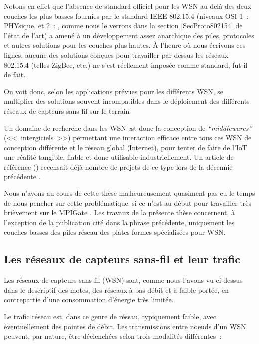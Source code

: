 Notons en effet que l'absence de standard officiel pour les WSN au-delà
des deux couches les plus basses fournies par le standard IEEE 802.15.4
(niveaux OSI 1~: PHYsique, et 2~: , comme
nous le verrons dans la section \vref{SecProto802154} de l'état
de l'art) a amené à un développement assez anarchique des piles, protocoles
et autres solutions pour les couches plus hautes. À l'heure où nous écrivons
ces lignes, aucune des solutions conçues pour travailler par-dessus les
réseaux 802.15.4 (telles ZigBee, etc.) ne s'est réellement imposée comme
standard, fut-il de fait.

On voit donc, selon les applications prévues pour les différents WSN,
se multiplier des solutions souvent incompatibles dans le déploiement
des différents réseaux de capteurs sans-fil sur le terrain.

Un domaine de recherche dans les WSN est donc la conception de
\emph{``middlewares''} (<<~intergiciels~>>) permettant une interaction
efficace entre tous ces WSN de conception différente et le réseau global
(Internet), pour tenter de faire de l'IoT une réalité tangible, fiable et
donc utilisable industriellement. Un article de référence ()
recensait déjà nombre de projets de ce type lors de la décennie précédente
\cite{Middleware-WSN-Survey-2008}.

Nous n'avons au cours de cette thèse malheureusement quasiment pas
eu le temps de nous pencher sur cette problématique, si ce n'est au
début pour travailler très brièvement sur le  MPIGate
\cite{KR-UbiMob-2013}. Les travaux de la présente thèse concernent,
à l'exception de la publication cité dans la phrase précédente,
uniquement les couches basses des piles réseau des plates-formes
spécialisées pour WSN.


\subsection{Les réseaux de capteurs sans-fil et leur trafic}
\label{SubsecTraficWSN}

Les réseaux de capteurs sans-fil (WSN) sont, comme nous l'avons vu
ci-dessus dans le descriptif des motes, des réseaux à bas débit et
à faible portée, en contrepartie d'une consommation d'énergie très
limitée.

Le trafic réseau est, dans ce genre de réseau, typiquement faible,
avec éventuellement des pointes de débit. Les transmissions entre
noeuds d'un WSN peuvent, par nature, être déclenchées selon trois
modalités différentes~:

